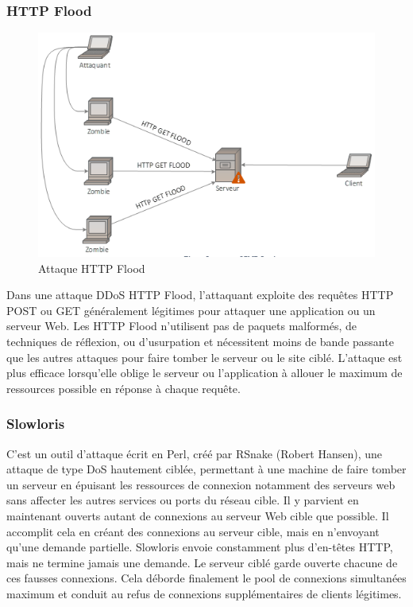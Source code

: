 	\subsubsection{HTTP Flood}
	\begin{figure}[h]
		\begin{center}
			\includegraphics[width=\textwidth]{IMAGES/ORIGINALS/Attaque_HTTP_Flood}
		\end{center}
		\caption{Attaque HTTP Flood}
	\end{figure}

	Dans une attaque DDoS HTTP Flood, l'attaquant exploite des requêtes HTTP POST ou GET généralement légitimes pour attaquer une application ou un serveur Web. Les HTTP Flood n'utilisent pas de paquets malformés, de techniques de réflexion, ou d'usurpation et nécessitent moins de bande passante que les autres attaques pour faire tomber le serveur ou le site ciblé. L'attaque est plus efficace lorsqu'elle oblige le serveur ou l'application à allouer le maximum de ressources possible en réponse à chaque requête.
	
	\subsubsection{Slowloris}
	C’est un outil d’attaque écrit en Perl, créé par RSnake (Robert Hansen), une attaque de type DoS hautement ciblée, permettant à une machine de faire tomber un serveur en épuisant les ressources de connexion notamment des serveurs web sans affecter les autres services ou ports du réseau cible. Il y parvient en maintenant ouverts autant de connexions au serveur Web cible que possible. Il accomplit cela en créant des connexions au serveur cible, mais en n'envoyant qu'une demande partielle. Slowloris envoie constamment plus d'en-têtes HTTP, mais ne termine jamais une demande. Le serveur ciblé garde ouverte chacune de ces fausses connexions. Cela déborde finalement le pool de connexions simultanées maximum et conduit au refus de connexions supplémentaires de clients légitimes.\\
	
